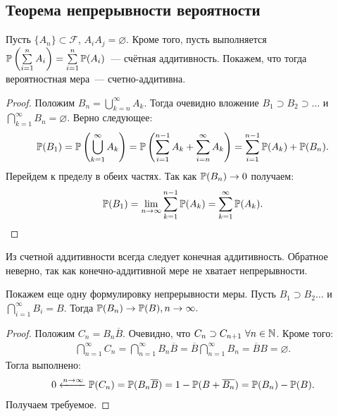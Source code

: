 \subsection{Теорема непрерывности вероятности}
\begin{property}
    Пусть $\{A_n\} \subset \mathcal{F}$, $A_iA_j = \varnothing.$ Кроме того, пусть выполняется $\P\left(\sum\limits_{i = 1}^{n} A_i\right) = \sum\limits_{i = 1}^{n} \P(A_i)$~--- счётная аддитивность. Покажем, что тогда вероятностная мера~--- счетно-аддитивна.
\end{property}
\begin{proof}
    Положим $B_n = \bigcup\limits_{k = n}^{\infty}A_k.$ Тогда очевидно вложение $B_1 \supset B_2 \supset \dots$ и \newline $\bigcap\limits_{k = 1}^{\infty}B_n = \varnothing$. Верно следующее: 
    \begin{gather*}
        \P(B_1) = \P\left(\bigcup_{k = 1}^{\infty} A_k\right) = \P\left(\sum_{i = 1}^{n - 1} A_k + \sum_{i = n}^{\infty} A_k \right) = \sum_{i = 1}^{n - 1} \P(A_k) + \P(B_n).
    \end{gather*} 
    Перейдем к пределу в обеих частях. Так как $\P(B_n) \rightarrow 0$ получаем: 
    \begin{gather*}
        \P(B_1) = \lim_{n \rightarrow \infty} \sum_{k = 1}^{n - 1} \P(A_k) = \sum_{k = 1}^{\infty} \P(A_k).
    \end{gather*}
\end{proof}

Из счетной аддитивности всегда следует конечная аддитивность. Обратное неверно, так как конечно-аддитивной мере не хватает непрерывности. 

\begin{property}
    Покажем еще одну формулировку непрерывности меры. Пусть $B_1 \supset B_2 \dots$ и $\bigcap\limits_{i = 1}^{\infty} B_i = B.$ Тогда $\P(B_n) \rightarrow \P(B), n \rightarrow \infty.$
\end{property}
\begin{proof}
    Положим $C_n = B_n\overline{B}$. Очевидно, что $C_n \supset C_{n+1} \ \forall n \in \N$. Кроме того: 
    \begin{gather*}
        \bigcap_{n = 1}^{\infty} C_n = \bigcap_{n = 1}^{\infty}B_n\overline{B} = \overline{B} \bigcap_{n = 1}^{\infty}B_n = \overline{B} B = \varnothing.
    \end{gather*}
    Тогла выполнено:
    \begin{gather*}
        0 \xleftarrow{n \rightarrow \infty} \P(C_n) = \P(B_n\overline{B}) = 1 - \P(B + \overline{B_n}) = \P(B_n) - \P(B).
    \end{gather*}
    Получаем требуемое.
\end{proof}


